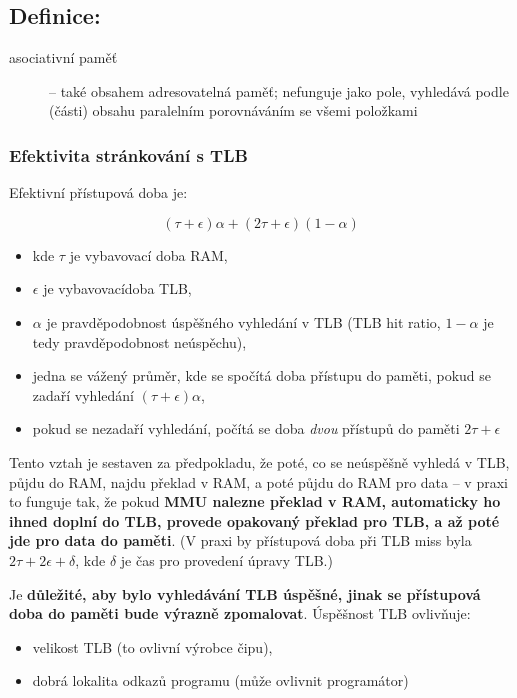 \documentclass[a4paper, 11pt]{article}
\begin{document}
\subsection*{Definice:}
\begin{description}
\item[asociativní paměť] -- také obsahem adresovatelná paměť; nefunguje jako pole, vyhledává podle (části) obsahu paralelním porovnáváním se všemi položkami
\end{description}

\subsubsection{Efektivita stránkování s TLB}
Efektivní přístupová doba je:

$$(\tau + \epsilon) \alpha + (2 \tau + \epsilon)(1 - \alpha)$$

\begin{itemize}
    \item kde $\tau$ je vybavovací doba RAM,
    \item $\epsilon$ je vybavovacídoba TLB,
    \item $\alpha$ je pravděpodobnost úspěšného vyhledání v TLB (TLB hit ratio, $1 - \alpha$ je tedy pravděpodobnost neúspěchu),
    \item jedna se vážený průměr, kde se spočítá doba přístupu do paměti, pokud se zadaří vyhledání $(\tau + \epsilon) \alpha$,
    \item pokud se nezadaří vyhledání, počítá se doba \emph{dvou} přístupů do paměti $2\tau + \epsilon$
\end{itemize}

Tento vztah je sestaven za předpokladu, že poté, co se neúspěšně vyhledá v TLB, půjdu do RAM, najdu překlad v RAM, a poté půjdu do RAM pro data -- v praxi to funguje tak, že pokud \textbf{MMU nalezne překlad v RAM, automaticky ho ihned doplní do TLB, provede opakovaný překlad pro TLB, a až poté jde pro data do paměti}. (V praxi by přístupová doba při TLB miss byla $2\tau + 2\epsilon + \delta$, kde $\delta$ je čas pro provedení úpravy TLB.)
 
Je \textbf{důležité, aby bylo vyhledávání TLB úspěšné, jinak se přístupová doba do paměti bude výrazně zpomalovat}. Úspěšnost TLB ovlivňuje:
\begin{itemize}
    \item velikost TLB (to ovlivní výrobce čipu),
    \item dobrá lokalita odkazů programu (může ovlivnit programátor)
\end{itemize}
 
\end{document}
